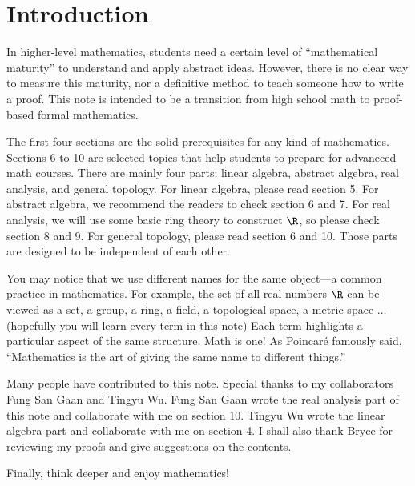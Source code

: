\documentclass[10pt]{article}
\begin{document}
\hsetup
\htoc
\hmain
\section*{Introduction}
In higher-level mathematics, students need a certain level of ``mathematical maturity'' to understand and apply abstract ideas. However, there is no clear way to measure this maturity, nor a definitive method to teach someone how to write a proof. This note is intended to be a transition from high school math to proof-based formal mathematics.
\par
The first four sections are the solid prerequisites for any kind of mathematics. Sections 6 to 10 are selected topics that help students to prepare for advaneced math courses. There are mainly four parts: linear algebra, abstract algebra, real analysis, and general topology. For linear algebra, please read section 5. For abstract algebra, we recommend the readers to check section 6 and 7. For real analysis, we will use some basic ring theory to construct $\R$, so please check section 8 and 9. For general topology, please read section 6 and 10. Those parts are designed to be independent of each other.
\par
You may notice that we use different names for the same object—a common practice in mathematics. For example, the set of all real numbers $\R$ can be viewed as a set, a group, a ring, a field, a topological space, a metric space $\dots$ (hopefully you will learn every term in this note) Each term highlights a particular aspect of the same structure. Math is one! As Poincaré famously said, ``Mathematics is the art of giving the same name to different things.''
\par
Many people have contributed to this note. Special thanks to my collaborators Fung San Gaan and Tingyu Wu. Fung San Gaan wrote the real analysis part of this note and collaborate with me on section 10. Tingyu Wu wrote the linear algebra part and collaborate with me on section 4. I shall also thank Bryce for reviewing my proofs and give suggestions on the contents.
\par
Finally, think deeper and enjoy mathematics!
\end{document}
